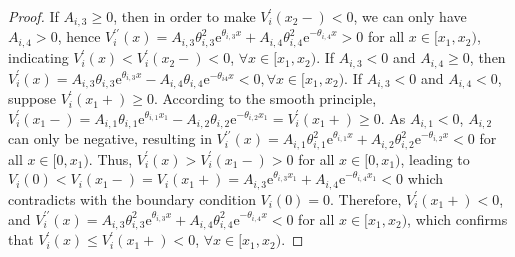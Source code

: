 \documentclass[11pt,reqno]{article}%
\numberwithin{equation}{section}
\begin{document}
\begin{proof}
If $A_{i,3} \ge 0$, then in order to make $V^\prime_i(x_2-) < 0$, we can only have $A_{i,4} > 0$,  hence $V^{\prime\prime}_i(x) = A_{i,3} \theta_{i,3}^2 \mathrm{e}^{\theta_{i,3} x} + A_{i,4} \theta_{i,4}^2 \mathrm{e}^{-\theta_{i,4} x} > 0$ for all $x \in [x_1, x_2)$, indicating $V^\prime_i(x) < V^\prime_i(x_2-) < 0$, $\forall x \in [x_1, x_2)$. If $A_{i,3} < 0$ and $A_{i,4} \ge 0$, then $V^\prime_i(x)=A_{i,3} \theta_{i,3} \mathrm{e}^{\theta_{i,3} x} - A_{i,4} \theta_{i,4} \mathrm{e}^{-\theta_{i4} x} < 0, \forall x \in [x_1, x_2)$. If $A_{i,3} < 0$ and $A_{i,4} < 0$, suppose $V_i^\prime(x_1+) \ge 0$.  According to the smooth principle, $V_i^\prime(x_1-) = A_{i,1} \theta_{i,1} \mathrm{e}^{\theta_{i,1}x_1} - A_{i,2} \theta_{i,2} \mathrm{e}^{-\theta_{i,2}x_1}=V_i^\prime(x_1+) \ge 0$.
As $A_{i,1} < 0$,  $A_{i,2}$ can only be negative, resulting in $V_i^{\prime\prime}(x) = A_{i,1} \theta_{i,1}^2 \mathrm{e}^{\theta_{i,1}x} + A_{i,2} \theta_{i,2}^2 \mathrm{e}^{-\theta_{i,2}x} < 0$ for all $x \in [0, x_1)$.   Thus, $V_i^\prime(x) > V_i^\prime(x_1-)> 0$ for all $x \in [0, x_1)$,  leading to $V_i(0) < V_i(x_1-) = V_i(x_1+) = A_{i,3} \mathrm{e}^{\theta_{i,3}x_1} + A_{i,4} \mathrm{e}^{-\theta_{i,4}x_1} < 0$ which contradicts with the boundary condition $V_i(0) = 0$.  
 Therefore, $V_i^\prime(x_1+)<0$, and $V^{\prime\prime}_i(x) =  A_{i,3} \theta_{i,3}^2 \mathrm{e}^{\theta_{i,3} x} + A_{i,4} \theta_{i,4}^2 \mathrm{e}^{-\theta_{i,4} x} < 0$ for all $x \in [x_1, x_2)$, which confirms that $V_i^\prime(x) \le V_i^\prime(x_1+) < 0$, $\forall x \in [x_1, x_2)$.


\end{proof}
\end{document}
